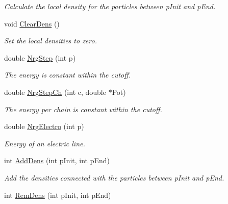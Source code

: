 \begin{DoxyCompactItemize}
\begin{DoxyCompactList}\small\item\em \-Calculate the local density for the particles between p\-Init and p\-End. \end{DoxyCompactList}\item 
\hypertarget{classForces_a0390d97ed1665851fb6175342d1c598b}{void \hyperlink{classForces_a0390d97ed1665851fb6175342d1c598b}{\-Clear\-Dens} ()}\label{classForces_a0390d97ed1665851fb6175342d1c598b}

\begin{DoxyCompactList}\small\item\em \-Set the local densities to zero. \end{DoxyCompactList}\item 
double \hyperlink{classForces_aa0300c3611e3180e228fda26be216a09}{\-Nrg\-Step} (int p)
\begin{DoxyCompactList}\small\item\em \-The energy is constant within the cutoff. \end{DoxyCompactList}\item 
\hypertarget{classForces_a65ed048334c9f52f87bd30a01b174739}{double \hyperlink{classForces_a65ed048334c9f52f87bd30a01b174739}{\-Nrg\-Step\-Ch} (int c, double $\ast$\-Pot)}\label{classForces_a65ed048334c9f52f87bd30a01b174739}

\begin{DoxyCompactList}\small\item\em \-The energy per chain is constant within the cutoff. \end{DoxyCompactList}\item 
\hypertarget{classForces_afc300be0d6cee6289a532bfa34cd551d}{double \hyperlink{classForces_afc300be0d6cee6289a532bfa34cd551d}{\-Nrg\-Electro} (int p)}\label{classForces_afc300be0d6cee6289a532bfa34cd551d}

\begin{DoxyCompactList}\small\item\em \-Energy of an electric line. \end{DoxyCompactList}\item 
\hypertarget{classForces_a9d4e2ba1cf8ce2142f50a1b7e8bf4f7b}{int \hyperlink{classForces_a9d4e2ba1cf8ce2142f50a1b7e8bf4f7b}{\-Add\-Dens} (int p\-Init, int p\-End)}\label{classForces_a9d4e2ba1cf8ce2142f50a1b7e8bf4f7b}

\begin{DoxyCompactList}\small\item\em \-Add the densities connected with the particles between p\-Init and p\-End. \end{DoxyCompactList}\item 
\hypertarget{classForces_ab1186dfbad2e6906d0da986495e05872}{int \hyperlink{classForces_ab1186dfbad2e6906d0da986495e05872}{\-Rem\-Dens} (int p\-Init, int p\-End)}\label{classForces_ab1186dfbad2e6906d0da986495e05872}


\end{DoxyCompactItemize}
